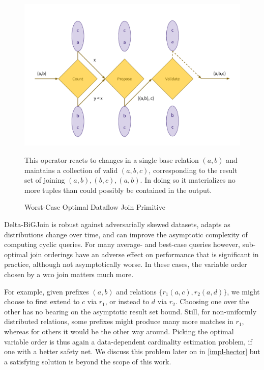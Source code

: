 \documentclass[../catalog.tex]{subfiles}
\begin{document}
\begin{figure}[h!]
  \includegraphics[width=1.0\linewidth]{diagrams/wco_dataflow}
  \caption{Worst-Case Optimal Dataflow Join Primitive}
  \label{fig:wco-illustration}
  \medskip
  \small

  This operator reacts to changes in a single base relation $(a,b)$
  and maintains a collection of valid $(a,b,c)$, corresponding to the
  result set of joining $(a,b), (b,c), (a,b)$. In doing so it
  materializes no more tuples than could possibly be contained in the
  output.
\end{figure}

Delta-BiGJoin is robust against adversarially skewed datasets, adapts
as distributions change over time, and can improve the asymptotic
complexity of computing cyclic queries. For many average- and
best-case queries however, sub-optimal join orderings have an adverse
effect on performance that is significant in practice, although not
asymptotically worse. In these cases, the variable order chosen by a
wco join matters much more.

For example, given prefixes $(a,b)$ and relations $\{r_1(a,c),
r_2(a,d)\}$, we might choose to first extend to $c$ via $r_1$, or
instead to $d$ via $r_2$. Choosing one over the other has no bearing
on the asymptotic result set bound. Still, for non-uniformly
distributed relations, some prefixes might produce many more matches
in $r_1$, whereas for others it would be the other way around. Picking
the optimal variable order is thus again a data-dependent cardinality
estimation problem, if one with a better safety net. We discuss this
problem later on in \autoref{impl-hector} but a satisfying solution is
beyond the scope of this work.
\end{document}
